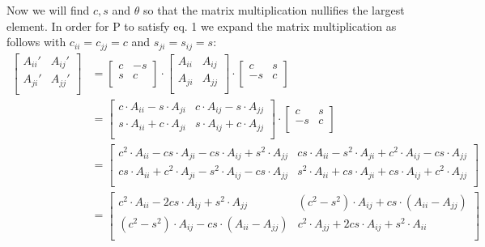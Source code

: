 \documentclass[12pt,twoside]{article}
\begin{document}
Now we will find $c, s$ and $\theta$ so that the matrix multiplication nullifies the largest element. In order for P to satisfy eq. 1 we expand the matrix multiplication as follows with $c_{ii}=c_{jj}=c$ and $s_{ji}=s_{ij}=s$:\\
\begin{equation}
\begin{split}
\begin{bmatrix}
     A_{ii}' & A_{ij}' \\
    A_{ji}' & A_{jj}' \\
\end{bmatrix}
 &=
\begin{bmatrix}
     c & -s \\
    s & c \\
\end{bmatrix}
\cdot
\begin{bmatrix}
     A_{ii} & A_{ij} \\
    A_{ji} & A_{jj} \\
\end{bmatrix}
\cdot
\begin{bmatrix}
     c & s \\
     -s & c \\
\end{bmatrix}\\
&=\begin{bmatrix}
     c\cdot A_{ii} - s\cdot A_{ji} & c\cdot A_{ij} - s\cdot A_{jj} \\
     s\cdot A_{ii} + c\cdot A_{ji} & s\cdot A_{ij} + c\cdot A_{jj} \\
\end{bmatrix}
\cdot
\begin{bmatrix}
     c & s \\
     -s & c \\
\end{bmatrix}\\
&=\begin{bmatrix}
c^2\cdot A_{ii} - cs\cdot A_{ji} - cs\cdot A_{ij} + s^2\cdot A_{jj} & cs\cdot A_{ii} - s^2\cdot A_{ji} + c^2\cdot A_{ij} - cs\cdot A_{jj}\\
cs\cdot A_{ii} + c^2\cdot A_{ji} - s^2\cdot A_{ij} - cs\cdot A_{jj} & s^2\cdot A_{ii} + cs\cdot A_{ji} + cs\cdot A_{ij} + c^2\cdot A_{jj}\\
\end{bmatrix}\\
&=\begin{bmatrix}
c^2\cdot A_{ii} - 2cs\cdot A_{ij}  + s^2\cdot A_{jj} & (c^2-s^2)\cdot A_{ij}  + cs\cdot (A_{ii} - A_{jj})\\
(c^2-s^2)\cdot A_{ij}  - cs\cdot (A_{ii} - A_{jj}) & c^2\cdot A_{jj} + 2cs\cdot A_{ij} + s^2\cdot A_{ii}\\
\end{bmatrix}
\end{split}
\end{equation}
\end{document}
